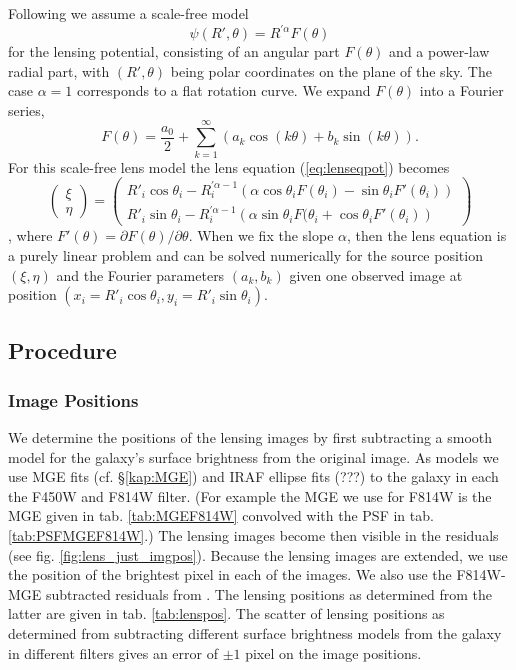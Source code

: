 \documentclass[useAMS,usenatbib]{mn2e}
\begin{document}
Following \citet{EvansWitt} we assume a scale-free model
\begin{equation*}
\psi(R',\theta) = R^{'\alpha} F(\theta) \label{eq:scalefreemodel}
\end{equation*}
for the lensing potential, consisting of an angular part $F(\theta)$ and a power-law radial part, with $(R',\theta)$ being polar coordinates on the plane of the sky. The case $\alpha = 1$ corresponds to a flat rotation curve. We expand $F(\theta)$ into a Fourier series,
\begin{equation}
F(\theta) = \frac{a_0}{2} + \sum_{k=1}^{\infty} \left(a_k \cos(k\theta) + b_k \sin (k\theta) \right). \label{eq:Fourieransatz}
\end{equation}
For this scale-free lens model the lens equation (\ref{eq:lenseqpot}) becomes
\begin{equation}
\begin{pmatrix} \xi \\ \eta \end{pmatrix} = \begin{pmatrix} R'_i \cos \theta_i - R_i^{'\alpha-1} \left(\alpha \cos \theta_i F(\theta_i) - \sin \theta_i F'(\theta_i) \right) \\ R'_i \sin \theta_i - R_i^{'\alpha-1} \left(\alpha \sin \theta_i F(\theta_i + \cos \theta_i F'(\theta_i) \right)\end{pmatrix}\label{eq:Fourierlenseq}
\end{equation}
\citep{EvansWitt}, where $F'(\theta) = \partial F(\theta) / \partial \theta$. When we fix the slope $\alpha$, then the lens equation is a purely linear problem and can be solved numerically for the source position $(\xi,\eta)$ and the Fourier parameters $(a_k,b_k)$ given one observed image at position $(x_i=R'_i \cos \theta_i,y_i=R'_i \sin \theta_i)$. 

\subsection{Procedure}

\subsubsection{Image Positions}

We determine the positions of the lensing images by first subtracting a smooth model for the galaxy's surface brightness from the original image. As models we use MGE fits (cf. \S\ref{kap:MGE}) and IRAF ellipse fits (???) to the galaxy in each the F450W and F814W filter. (For example the MGE we use for F814W is the MGE given in tab. \ref{tab:MGEF814W} convolved with the PSF in tab. \ref{tab:PSFMGEF814W}.) The lensing images become then visible in the residuals (see fig. \ref{fig:lens_just_imgpos}). Because the lensing images are extended, we use the position of the brightest pixel in each of the images. We also use the F814W-MGE subtracted residuals from \citet{SWELLSIII}. The lensing positions as determined from the latter are given in tab. \ref{tab:lenspos}. The scatter of lensing positions as determined from subtracting different surface brightness models from the galaxy in different filters gives an error of $\pm 1$ pixel on the image positions.
\end{document}
